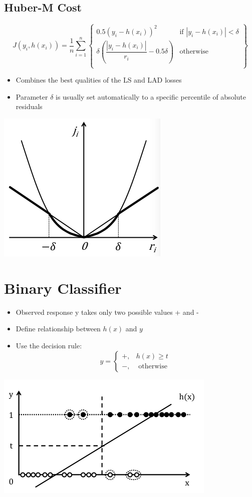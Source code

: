 \documentclass{article}[18pt]
\begin{document}
\subsection{Huber-M Cost}
$$J(y_i,h(x_i))=\dfrac{1}{n}\sum_{i=1}^{n}\left\{\begin{array}{lr}
0.5(y_i-h(x_i))^2 & \text{if } |y_i-h(x_i)|<\delta\\
\delta(\dfrac{|y_i-h(x_i)|}{r_i}-0.5\delta) & \text{otherwise}\\
\end{array}\right\}$$
\begin{itemize}
	\item Combines the best qualities of the LS and LAD losses
	\item Parameter $\delta$ is usually set automatically to a specific percentile of absolute residuals
\end{itemize}
\begin{center}
	\includegraphics[scale=0.7]{Huber-M}
\end{center}
\newpage
\section{Binary Classifier}
\begin{itemize}
	\item Observed response y takes only two possible values + and -
	\item Define relationship between $h(x)$ and $y$
	\item Use the decision rule:
	\[
	\hat{y}=\left\{\begin{array}{ll}
	{+,} & {h(x) \geq t} \\
	{-,} & {\text { otherwise }}
	\end{array}\right.
	\]
\end{itemize}
\begin{center}
	\includegraphics[scale=0.7]{"Binary Classifier"}
\end{center}
\end{document}
